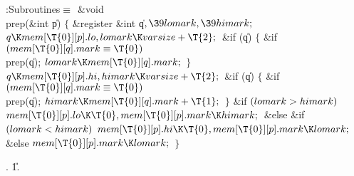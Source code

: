 \Y\B\4\*:Subroutines\X${}\equiv{}$\6
\1\1\&{void} \\{prep}(\&{int} \|p)\2\2\6
${}\{{}$\1\6
\&{register} \&{int} \|q${},\39\\{lomark},\39\\{himark};{}$\7
${}\|q\K\\{mem}[\T{0}][\|p].\\{lo},\39\\{lomark}\K\\{varsize}+\T{2};{}$\6
\&{if} (\|q)\5
${}\{{}$\1\6
\&{if} ${}(\\{mem}[\T{0}][\|q].\\{mark}\E\T{0}){}$\1\5
\\{prep}(\|q);\2\6
${}\\{lomark}\K\\{mem}[\T{0}][\|q].\\{mark};{}$\6
\4${}\}{}$\2\6
${}\|q\K\\{mem}[\T{0}][\|p].\\{hi},\39\\{himark}\K\\{varsize}+\T{2};{}$\6
\&{if} (\|q)\5
${}\{{}$\1\6
\&{if} ${}(\\{mem}[\T{0}][\|q].\\{mark}\E\T{0}){}$\1\5
\\{prep}(\|q);\2\6
${}\\{himark}\K\\{mem}[\T{0}][\|q].\\{mark}+\T{1};{}$\6
\4${}\}{}$\2\6
\&{if} ${}(\\{lomark}>\\{himark}){}$\1\5
${}\\{mem}[\T{0}][\|p].\\{lo}\K\T{0},\39\\{mem}[\T{0}][\|p].\\{mark}\K%
\\{himark};{}$\2\6
\&{else} \&{if} ${}(\\{lomark}<\\{himark}){}$\1\5
${}\\{mem}[\T{0}][\|p].\\{hi}\K\T{0},\39\\{mem}[\T{0}][\|p].\\{mark}\K%
\\{lomark};{}$\2\6
\&{else}\1\5
${}\\{mem}[\T{0}][\|p].\\{mark}\K\\{lomark};{}$\2\6
\4${}\}{}$\2\par
{}\*.
\U1\*.\fi

